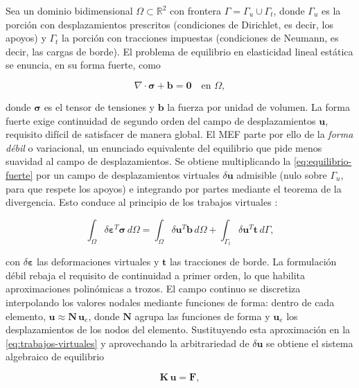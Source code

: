 Sea un dominio bidimensional $\Omega \subset \mathbb{R}^2$ con frontera $\Gamma = \Gamma_u \cup \Gamma_t$, donde $\Gamma_u$ es la porción con desplazamientos prescritos (condiciones de Dirichlet, es decir, los apoyos) y $\Gamma_t$ la porción con tracciones impuestas (condiciones de Neumann, es decir, las cargas de borde). El problema de equilibrio en elasticidad lineal estática se enuncia, en su forma fuerte, como

\begin{equation}
\nabla \cdot \bm{\sigma} + \bm{b} = \bm{0} \quad \text{en } \Omega,
\label{eq:equilibrio-fuerte}
\end{equation}

donde $\bm{\sigma}$ es el tensor de tensiones y $\bm{b}$ la fuerza por unidad de volumen. La forma fuerte exige continuidad de segundo orden del campo de desplazamientos $\bm{u}$, requisito difícil de satisfacer de manera global. El MEF parte por ello de la \emph{forma débil} o variacional, un enunciado equivalente del equilibrio que pide menos suavidad al campo de desplazamientos. Se obtiene multiplicando la \autoref{eq:equilibrio-fuerte} por un campo de desplazamientos virtuales $\delta\bm{u}$ admisible (nulo sobre $\Gamma_u$, para que respete los apoyos) e integrando por partes mediante el teorema de la divergencia. Esto conduce al principio de los trabajos virtuales \autocites[pp.~69-71]{zienkiewicz2013fem}[pp.~77-79]{hughes2000fem}[pp.~612-613]{reddy2006introduction}:

\begin{equation}
\int_\Omega \delta\bm{\varepsilon}^{T} \bm{\sigma} \, d\Omega
= \int_\Omega \delta\bm{u}^{T} \bm{b} \, d\Omega
+ \int_{\Gamma_t} \delta\bm{u}^{T} \bm{t} \, d\Gamma,
\label{eq:trabajos-virtuales}
\end{equation}

con $\delta\bm{\varepsilon}$ las deformaciones virtuales y $\bm{t}$ las tracciones de borde. La formulación débil rebaja el requisito de continuidad a primer orden, lo que habilita aproximaciones polinómicas a trozos. El campo continuo se discretiza interpolando los valores nodales mediante funciones de forma: dentro de cada elemento, $\bm{u} \approx \bm{N}\,\bm{u}_e$, donde $\bm{N}$ agrupa las funciones de forma y $\bm{u}_e$ los desplazamientos de los nodos del elemento. Sustituyendo esta aproximación en la \autoref{eq:trabajos-virtuales} y aprovechando la arbitrariedad de $\delta\bm{u}$ se obtiene el sistema algebraico de equilibrio

\begin{equation}
\bm{K}\,\bm{u} = \bm{F},
\label{eq:sistema-global}
\end{equation}

